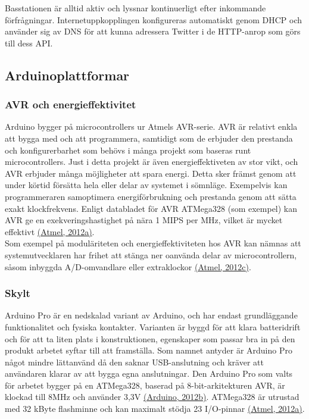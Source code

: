 \documentclass[a4paper,11pt]{article}
\begin{document}
Basstationen är alltid aktiv och lyssnar kontinuerligt efter inkommande förfrågningar. Internetuppkopplingen konfigureras automatiskt genom DHCP och använder sig av DNS för att kunna adressera Twitter i de HTTP-anrop som görs till dess API.

\subsection{Arduinoplattformar}

\subsubsection{AVR och energieffektivitet}
Arduino bygger på microcontrollers ur Atmels AVR-serie. AVR är relativt enkla att bygga med och att programmera, samtidigt som de erbjuder den prestanda och konfigurerbarhet som behövs i många projekt som baseras runt microcontrollers. Just i detta projekt är även energieffektiveten av stor vikt, och AVR erbjuder många möjligheter att spara energi. Detta sker främst genom att under körtid försätta hela eller delar av systemet i sömnläge. Exempelvis kan programmeraren samoptimera energiförbrukning och prestanda genom att sätta exakt klockfrekvens. Enligt databladet för AVR ATMega328 (som exempel) kan AVR ge en exekveringshastighet på nära 1 MIPS per MHz, vilket är mycket effektivt \hyperref[atmel]{(Atmel, 2012a)}. \\

Som exempel på moduläriteten och energieffektiviteten hos AVR kan nämnas att systemutvecklaren har frihet att stänga ner oanvända delar av microcontrollern, såsom inbyggda A/D-omvandlare eller extraklockor \hyperref[atmel]{(Atmel, 2012c)}.

\subsubsection{Skylt}
\label{skylt}
Arduino Pro är en nedskalad variant av Arduino, och har endast grundläggande funktionalitet och fysiska kontakter. Varianten är byggd för att klara batteridrift och för att ta liten plats i konstruktionen, egenskaper som passar bra in på den produkt arbetet syftar till att framställa. Som namnet antyder är Arduino Pro något mindre lättanvänd då den saknar USB-anslutning och kräver att användaren klarar av att bygga egna anslutningar. Den Arduino Pro som valts för arbetet bygger på en ATMega328, baserad på 8-bit-arkitekturen AVR, är klockad till 8MHz och använder 3,3V \hyperref[arduino]{(Arduino, 2012b)}. ATMega328 är utrustad med 32 kByte flashminne och kan maximalt stödja 23 I/O-pinnar \hyperref[atmel]{(Atmel, 2012a)}.
\end{document}
